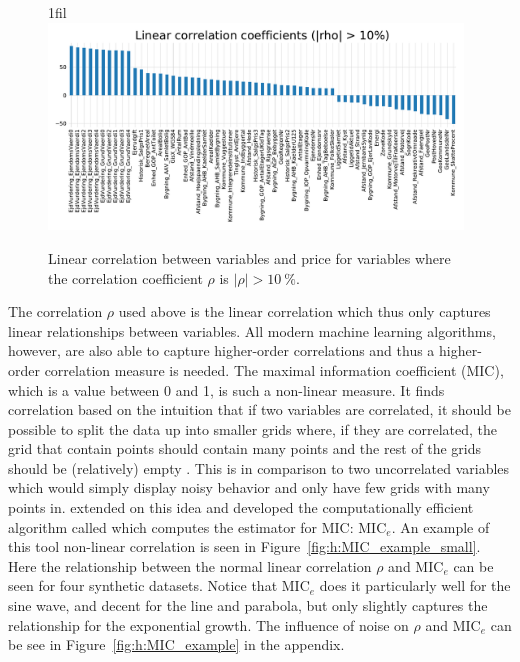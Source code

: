 \documentclass[a4paper, twoside, nobib]{tufte-book}
\makeatletter
\newcommand{\abs}[1]{\lvert#1\rvert}
\newcommand*{\centerfloat}{%
  \parindent \z@
  \leftskip \z@ \@plus 1fil \@minus \textwidth
  \rightskip\leftskip
  \parfillskip \z@skip}
\newcommand{\code}[1]{\colorbox{light-gray}{\texttt{\detokenize{#1}}}}
\newcommand{\autocite}[1]{\citep{#1}}
\makeatother
\begin{document}
\begin{figure}
  \centerfloat
  \includegraphics[width=0.98\textwidth, trim=0 0 0 40, clip]{figures/housing/lin_correlation.pdf}
  \caption[Linear correlation between variables and price]
          {Linear correlation between variables and price for variables where the correlation coefficient $\rho$ is $\abs{\rho} > \SI{10}{\percent}$.}
  \label{fig:h:corr_lin}
\end{figure}

The correlation $\rho$ used above is the linear correlation which thus only captures linear relationships between variables. All modern machine learning algorithms, however, are also able to capture higher-order correlations and thus a higher-order correlation measure is needed. The maximal information coefficient (MIC), which is a value between \num{0} and \num{1}, is such a non-linear measure. It finds correlation based on the intuition that if two variables are correlated, it should be possible to split the data up into smaller grids where, if they are correlated, the grid that contain points should contain many points and the rest of the grids should be (relatively) empty \autocite{reshefDetectingNovelAssociations2011}. This is in comparison to two uncorrelated variables which would simply display noisy behavior and only have few grids with many points in. \citet{albanesePracticalToolMaximal2018a} extended on this idea and developed the computationally efficient algorithm called \code{MICtools} which computes the estimator for MIC: $\mathrm{MIC}_e$. An example of this tool non-linear correlation is seen in Figure~\ref{fig:h:MIC_example_small}. Here the relationship between the normal linear correlation $\rho$ and $\mathrm{MIC}_e$ can be seen for four synthetic datasets. Notice that $\mathrm{MIC}_e$ does it particularly well for the sine wave, and decent for the line and parabola, but only slightly captures the relationship for the exponential growth. The influence of noise on $\rho$ and $\mathrm{MIC}_e$ can be see in Figure~\ref{fig:h:MIC_example} in the appendix. 
\end{document}

